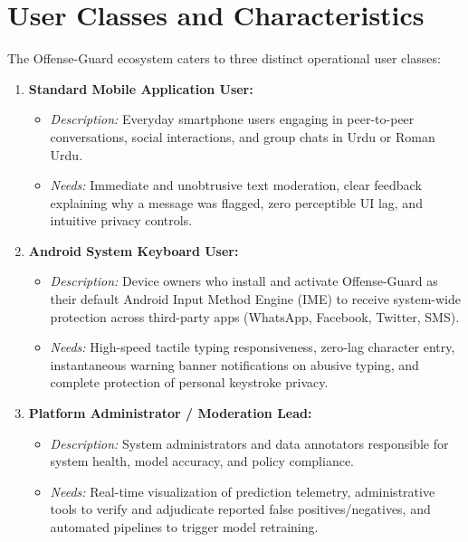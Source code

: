 \documentclass[A4paper,12pt]{report}
\theoremstyle{plain}
\theoremstyle{definition}
\theoremstyle{remark}
\numberwithin{equation}{section}
\begin{document}
\section{User Classes and Characteristics}
The Offense-Guard ecosystem caters to three distinct operational user classes:
\begin{enumerate}[leftmargin=*]
    \item \textbf{Standard Mobile Application User:}
    \begin{itemize}
        \item \textit{Description:} Everyday smartphone users engaging in peer-to-peer conversations, social interactions, and group chats in Urdu or Roman Urdu.
        \item \textit{Needs:} Immediate and unobtrusive text moderation, clear feedback explaining why a message was flagged, zero perceptible UI lag, and intuitive privacy controls.
    \end{itemize}
    \item \textbf{Android System Keyboard User:}
    \begin{itemize}
        \item \textit{Description:} Device owners who install and activate Offense-Guard as their default Android Input Method Engine (IME) to receive system-wide protection across third-party apps (WhatsApp, Facebook, Twitter, SMS).
        \item \textit{Needs:} High-speed tactile typing responsiveness, zero-lag character entry, instantaneous warning banner notifications on abusive typing, and complete protection of personal keystroke privacy.
    \end{itemize}
    \item \textbf{Platform Administrator / Moderation Lead:}
    \begin{itemize}
        \item \textit{Description:} System administrators and data annotators responsible for system health, model accuracy, and policy compliance.
        \item \textit{Needs:} Real-time visualization of prediction telemetry, administrative tools to verify and adjudicate reported false positives/negatives, and automated pipelines to trigger model retraining.
    \end{itemize}
\end{enumerate}
\end{document}
